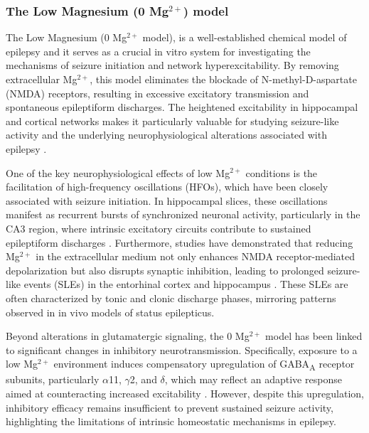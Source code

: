 \documentclass{article}
\begin{document}
\subsubsection{The Low Magnesium (0 \texorpdfstring{Mg$^{2+}$}{Mg2+}) model}

The Low Magnesium (0 Mg$^{2+}$ model), is a well-established chemical model of epilepsy and it serves as a crucial in vitro system for investigating the mechanisms of seizure initiation and network hyperexcitability. By removing extracellular Mg$^{2+}$, this model eliminates the blockade of N-methyl-D-aspartate (NMDA) receptors, resulting in excessive excitatory transmission and spontaneous epileptiform discharges. The heightened excitability in hippocampal and cortical networks makes it particularly valuable for studying seizure-like activity and the underlying neurophysiological alterations associated with epilepsy \cite{lasztoczi2004, zalay2010}.

One of the key neurophysiological effects of low Mg$^{2+}$ conditions is the facilitation of high-frequency oscillations (HFOs), which have been closely associated with seizure initiation. In hippocampal slices, these oscillations manifest as recurrent bursts of synchronized neuronal activity, particularly in the CA3 region, where intrinsic excitatory circuits contribute to sustained epileptiform discharges \cite{lasztoczi2004}. Furthermore, studies have demonstrated that reducing Mg$^{2+}$ in the extracellular medium not only enhances NMDA receptor-mediated depolarization but also disrupts synaptic inhibition, leading to prolonged seizure-like events (SLEs) in the entorhinal cortex and hippocampus \cite{zalay2010}. These SLEs are often characterized by tonic and clonic discharge phases, mirroring patterns observed in in vivo models of status epilepticus.

Beyond alterations in glutamatergic signaling, the 0 Mg$^{2+}$ model has been linked to significant changes in inhibitory neurotransmission. Specifically, exposure to a low Mg$^{2+}$ environment induces compensatory upregulation of GABA\textsubscript{A} receptor subunits, particularly $\alpha$11, $\gamma$2, and $\delta$, which may reflect an adaptive response aimed at counteracting increased excitability \cite{yu2017}. However, despite this upregulation, inhibitory efficacy remains insufficient to prevent sustained seizure activity, highlighting the limitations of intrinsic homeostatic mechanisms in epilepsy.
\end{document}
